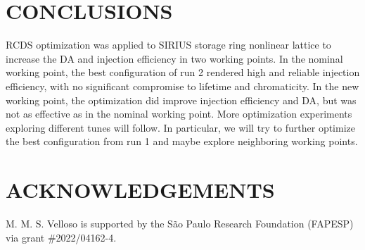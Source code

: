 \documentclass[a4paper,
               keeplastbox,   %
               ]{jacow}
\begin{document}
\section{CONCLUSIONS}
RCDS optimization was applied to SIRIUS storage ring nonlinear lattice to increase the DA and injection efficiency in two working points. In the nominal working point, the best configuration of run 2 rendered high and reliable injection efficiency, with no significant compromise to lifetime and chromaticity. In the new working point, the optimization did improve injection efficiency and DA, but was not as effective as in the nominal working point. More optimization experiments exploring different tunes will follow. In particular, we will try to further optimize the best configuration from run 1 and maybe explore neighboring working points.
\section{ACKNOWLEDGEMENTS}
M. M. S. Velloso is supported by the São Paulo Research Foundation (FAPESP) via grant \#2022/04162-4. 
%
%
	
\end{document}
